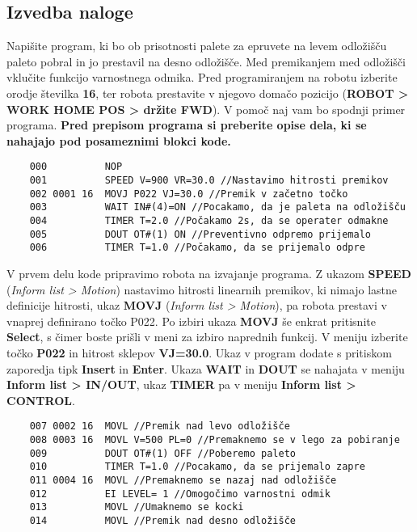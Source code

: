 \subsection{Izvedba naloge} \label{realni2}

Napišite program, ki bo ob prisotnosti palete za epruvete na levem odložišču paleto pobral in jo prestavil na desno odložišče. Med premikanjem med odložišči vklučite funkcijo varnostnega odmika. Pred programiranjem na robotu izberite orodje številka \textbf{16}, ter robota prestavite v njegovo domačo pozicijo (\textbf{ROBOT > WORK HOME POS > držite FWD}). V pomoč naj vam bo spodnji primer programa. \textbf{Pred prepisom programa si preberite opise dela, ki se nahajajo pod posameznimi blokci kode.}

\vspace{5mm}

\begin{mdframed}[backgroundcolor=gray!20, shadow=true,roundcorner=8pt]
	\begin{verbatim}
	000          NOP
	001          SPEED V=900 VR=30.0 //Nastavimo hitrosti premikov
	002 0001 16  MOVJ P022 VJ=30.0 //Premik v začetno točko
	003          WAIT IN#(4)=ON //Pocakamo, da je paleta na odložišču
	004          TIMER T=2.0 //Počakamo 2s, da se operater odmakne
	005          DOUT OT#(1) ON //Preventivno odpremo prijemalo
	006          TIMER T=1.0 //Počakamo, da se prijemalo odpre
\end{verbatim}
\end{mdframed}

\vspace{5mm}

V prvem delu kode pripravimo robota na izvajanje programa. Z ukazom \textbf{SPEED} (\textit{Inform list > Motion}) nastavimo hitrosti linearnih premikov, ki nimajo lastne definicije hitrosti, ukaz \textbf{MOVJ} (\textit{Inform list > Motion}), pa robota prestavi v vnaprej definirano točko P022. Po izbiri ukaza \textbf{MOVJ} še enkrat pritisnite \textbf{Select}, s čimer boste prišli v meni za izbiro naprednih funkcij. V meniju izberite točko \textbf{P022} in hitrost sklepov \textbf{VJ=30.0}. Ukaz v program dodate s pritiskom zaporedja tipk \textbf{Insert} in \textbf{Enter}. Ukaza \textbf{WAIT} in \textbf{DOUT} se nahajata v meniju \textbf{Inform list > IN/OUT}, ukaz \textbf{TIMER} pa v meniju \textbf{Inform list > CONTROL}.

\vspace{5mm}

\begin{mdframed}[backgroundcolor=gray!20, shadow=true,roundcorner=8pt]
	\begin{verbatim}
	007 0002 16  MOVL //Premik nad levo odložišče
	008 0003 16  MOVL V=500 PL=0 //Premaknemo se v lego za pobiranje
	009          DOUT OT#(1) OFF //Poberemo paleto
	010          TIMER T=1.0 //Pocakamo, da se prijemalo zapre
	011 0004 16  MOVL //Premaknemo se nazaj nad odložišče
	012          EI LEVEL= 1 //Omogočimo varnostni odmik
	013          MOVL //Umaknemo se kocki
	014          MOVL //Premik nad desno odložišče
\end{verbatim}
\end{mdframed}

